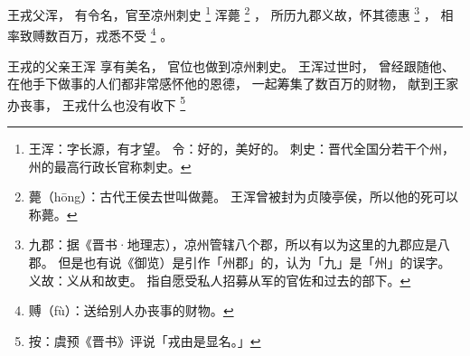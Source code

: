 
\switchcolumn*[\section{}]

王戎父浑，
有令名，官至凉州刺史%
\footnote{%
    王浑：字长源，有才望。
    令：好的，美好的。
    刺史：晋代全国分若干个州，州的最高行政长官称刺史。
}%
浑薨%
\footnote{%
    薨（hōng）：古代王侯去世叫做薨。
                王浑曾被封为贞陵亭侯，所以他的死可以称薨。
}%
，
所历九郡义故，怀其德惠%
\footnote{%
    九郡：据《晋书·地理志），凉州管辖八个郡，所以有以为这里的九郡应是八郡。
          但是也有说《御览）是引作「州郡」的，认为「九」是「州」的误字。
    义故：义从和故吏。
          指自愿受私人招募从军的官佐和过去的部下。
}%
，
相率致赙数百万，戎悉不受%
\footnote{%
    赙（fù）：送给别人办丧事的财物。
}%
。

\switchcolumn

王戎的父亲王浑
享有美名，
官位也做到凉州剌史。
王浑过世时，
曾经跟随他、在他手下做事的人们都非常感怀他的恩德，
一起筹集了数百万的财物，
献到王家办丧事，
王戎什么也没有收下%
\footnote{%
    按：虞预《晋书》评说「戎由是显名。」
}%


